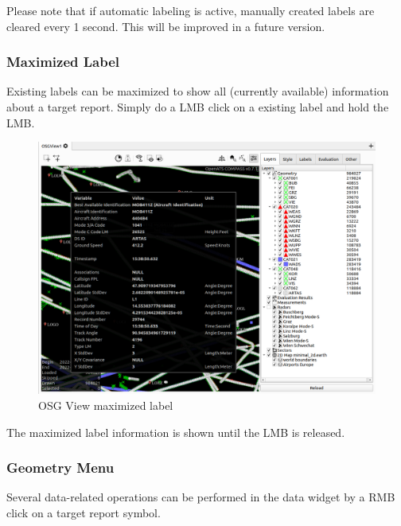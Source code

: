 Please note that if automatic labeling is active, manually created labels are cleared every 1 second. This will be improved in a future version.

\subsubsection{Maximized Label}

Existing labels can be maximized to show all (currently available) information about a target report. Simply do a LMB click on a existing label and hold the LMB.

\begin{figure}[H]
    \hspace*{-2.5cm}
    \includegraphics[width=19cm,frame]{figures/osgview_max_label.png}
  \caption{OSG View maximized label}
\end{figure}

The maximized label information is shown until the LMB is released.

\subsubsection{Geometry Menu}

Several data-related operations can be performed in the data widget by a RMB click on a target report symbol.

